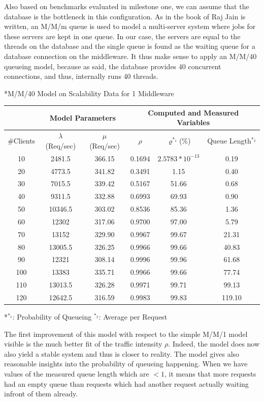 \documentclass[11pt]{article}
\begin{document}
Also based on benchmarks evaluated in milestone one, we can assume that the database is the bottleneck in this configuration. As in the book of Raj Jain is written, an M/M/m queue is used to model a multi-server system where jobs for these servers are kept in one queue. In our case, the servers are equal to the threads on the database and the single queue is found as the waiting queue for a database connection on the middleware. It thus make sense to apply an M/M/40 queueing model, because as said, the database provides 40 concurrent connections, and thus, internally runs 40 threads.

\begin{center}
	*{M/M/40 Model on Scalability Data for 1 Middleware}
	\begin{tabular}{c|c|c||c|c|c}
		\hline
		& \multicolumn{2}{c||}{Model Parameters} & \multicolumn{3}{c}{Computed and Measured Variables} \\
		\hline
		\#Clients & $\lambda$ (Req/sec) & $\mu$ (Req/sec) & $\rho$ & $\varrho^{*_1}$(\%) & Queue Length$^{*_2}$ \\
		\hline
		10 & 2481.5 & 366.15 & 0.1694 & $2.5783*10^{-13}$ & 0.19\\
		20 & 4773.5 & 341.82 & 0.3491 & 1.15 & 0.40\\
		30 & 7015.5 & 339.42 & 0.5167 & 51.66 & 0.68\\
		40 & 9311.5 & 332.88 & 0.6993 & 69.93 & 0.90\\
		50 & 10346.5 & 303.02 & 0.8536 &85.36 & 1.36\\
		60 & 12302 & 317.06 & 0.9700 & 97.00 & 5.79\\
		70 & 13152 & 329.90 & 0.9967 & 99.67 & 21.31\\
		80 & 13005.5 & 326.25 & 0.9966 & 99.66  & 40.83\\
		90 & 12321 & 308.14 & 0.9996 & 99.96 & 61.68\\
		100 & 13383 & 335.71 & 0.9966 & 99.66 & 77.74\\
		110 & 13013.5 & 326.28 & 0.9971 & 99.71 & 99.13\\
		120 & 12642.5 & 316.59 & 0.9983 & 99.83 & 119.10\\
		\hline		
	\end{tabular}
	*{$^{*_1}$: Probability of Queueing $^{*_2}$: Average per Request}
\end{center}

The first improvement of this model with respect to the simple M/M/1 model visible is the much better fit of the traffic intensity $\rho$. Indeed, the model does now also yield a stable system and thus is closer to reality. The model gives also reasonable insights into the probability of queueing happening. When we have values of the measured queue length which are $<1$, it means that more requests had an empty queue than requests which had another request actually waiting infront of them already.
\end{document}
